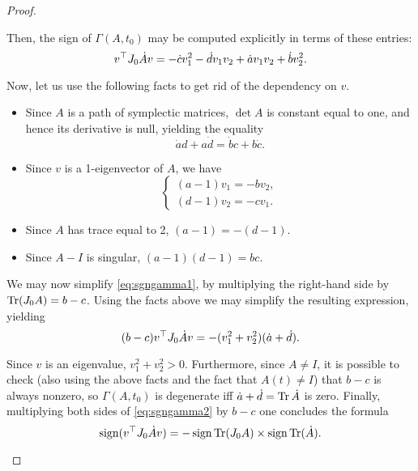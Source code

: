 \begin{proof}
\begin{enumerate}[label={Case \arabic*.}]
Then, the sign of $\Gamma(A,t_0)$ may be computed explicitly in terms of these entries:
\begin{equation}\label{eq:sgngamma1}
v^\top J_0 \dot A v = - \dot c v_1^2 - \dot d v_1 v_2 + \dot a v_1 v_2 + \dot b v_2^2.
\end{equation}

Now, let us use the following facts to get rid of the dependency on $v$.
\begin{itemize}
\item Since $A$ is a path of symplectic matrices, $\det A$ is constant equal to one, and hence its derivative is null, yielding the equality
\begin{equation}
\dot a d + a \dot d = \dot b c + b \dot c.
\end{equation}
\item Since $v$ is a 1-eigenvector of $A$, we have
\begin{equation}
\begin{cases}
(a-1)v_1 = - b v_2,\\
(d-1)v_2 = - c v_1.
\end{cases}
\end{equation}
\item Since $A$ has trace equal to 2, $(a-1) = - (d-1)$.
\item Since $A-I$ is singular, $(a-1)(d-1) = bc$.
\end{itemize}

We may now simplify \eqref{eq:sgngamma1}, by multiplying the right-hand side by $\operatorname{Tr}(J_0 A) = b-c$. Using the facts above we may simplify the resulting expression, yielding
\begin{equation}\label{eq:sgngamma2}
(b-c) v^\top J_0 \dot A v = - (v_1^2 + v_2^2)(\dot a + \dot d).
\end{equation}

Since $v$ is an eigenvalue, $v_1^2 + v_2^2 > 0$. Furthermore, since $A \neq I$, it is possible to check (also using the above facts and the fact that $A(t) \neq I$) that $b-c$ is always nonzero, so $\Gamma(A,t_0)$ is degenerate iff $\dot a + \dot d = \operatorname{Tr} \dot A$ is zero. Finally, multiplying both sides of \eqref{eq:sgngamma2} by $b-c$ one concludes the formula
\begin{equation}
\operatorname{sign}(v^\top J_0 \dot A v) = - \operatorname{sign} \operatorname{Tr}(J_0 A) \times \operatorname{sign} \operatorname{Tr}(\dot A).
\end{equation}
\end{enumerate}
\end{proof}

